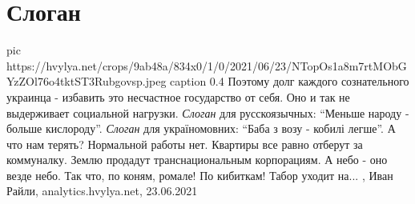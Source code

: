  
 
 
 
 
\chapter{Слоган}
\label{sec:slova.slogan}

\ifcmt
  pic https://hvylya.net/crops/9ab48a/834x0/1/0/2021/06/23/NTopOs1a8m7rtMObGYzZOl76o4tktST3Rubgovsp.jpeg
	caption 0.4
\fi
Поэтому долг каждого сознательного украинца - избавить это несчастное
государство от себя. Оно и так не выдерживает социальной нагрузки.
\emph{Слоган} для русскоязычных: \enquote{Меньше народу - больше кислороду}.
\emph{Слоган} для україномовних: \enquote{Баба з возу - кобилі легше}.  А что
нам терять?  Нормальной работы нет.  Квартиры все равно отберут за коммуналку.
Землю продадут транснациональным корпорациям.  А небо - оно везде небо.  Так
что, по коням, ромале!  По кибиткам! Табор уходит на...
, 
Иван Райли, analytics.hvylya.net, 23.06.2021

